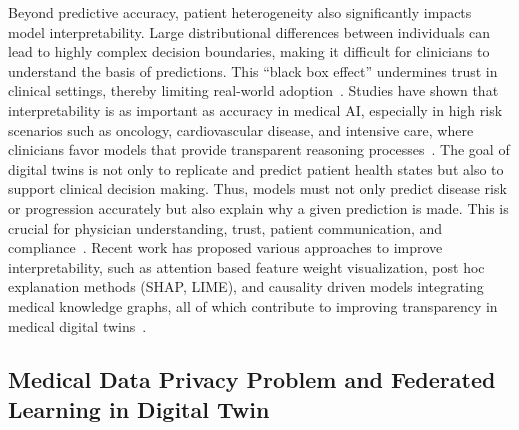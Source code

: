 \documentclass[acmsmall]{acmart}
\begin{document}
Beyond predictive accuracy, patient heterogeneity also significantly impacts model interpretability. Large distributional differences between individuals can lead to highly complex decision boundaries, making it difficult for clinicians to understand the basis of predictions. This ``black box effect'' undermines trust in clinical settings, thereby limiting real-world adoption~\cite{rudin2019stopexplaining}. Studies have shown that interpretability is as important as accuracy in medical AI, especially in high risk scenarios such as oncology, cardiovascular disease, and intensive care, where clinicians favor models that provide transparent reasoning processes~\cite{tonekaboni2019clinicians,lundberg2017unified}. The goal of digital twins is not only to replicate and predict patient health states but also to support clinical decision making. Thus, models must not only predict disease risk or progression accurately but also explain why a given prediction is made. This is crucial for physician understanding, trust, patient communication, and compliance~\cite{voigt2021digital}. Recent work has proposed various approaches to improve interpretability, such as attention based feature weight visualization, post hoc explanation methods (SHAP, LIME), and causality driven models integrating medical knowledge graphs, all of which contribute to improving transparency in medical digital twins~\cite{ahmad2018interpretable}.


\subsection{Medical Data Privacy Problem and Federated Learning in Digital Twin} 
\end{document}

